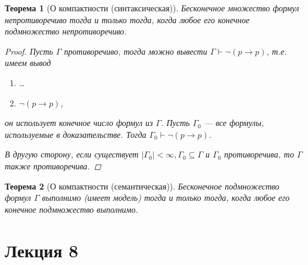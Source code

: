 \documentclass[12pt]{article}
\let\im\rightarrow
\let\n\neg
\theoremstyle{definition}
\theoremstyle{plain}
\newtheorem{theorem}{Теорема}[section]
\theoremstyle{remark}
\begin{document}
\begin{theorem}[О компактности (синтаксическая)]
  Бесконечное множество формул непротиворечиво тогда и только тогда,
  когда любое его конечное подмножество непротиворечиво.
  \begin{proof}
    Пусть $\Gamma$ противоречиво, тогда можно вывести $\Gamma \vdash
    \n (p \im p)$, т.е. имеем вывод
    \begin{enumerate}
      \item \dots

      \item $\n (p \im p)$,
    \end{enumerate}
    он использует конечное число формул из $\Gamma$. Пусть $\Gamma_0$
    --- все формулы, используемые в доказательстве. Тогда $\Gamma_0
    \vdash \n (p \im p)$.

    В другую сторону, если существует $|\Gamma_0| < \infty, \Gamma_0
    \subseteq \Gamma$ и $\Gamma_0$ противоречива, то $\Gamma$ также
    противоречива.
  \end{proof}
\end{theorem}

\begin{theorem}[О компактности (семантическая)]
  Бесконечное подмножество формул $\Gamma$ выполнимо (имеет модель)
  тогда и только тогда, когда любое его конечное подмножество выполнимо.
\end{theorem}
\pagebreak

\section{Лекция 8}
\end{document}

